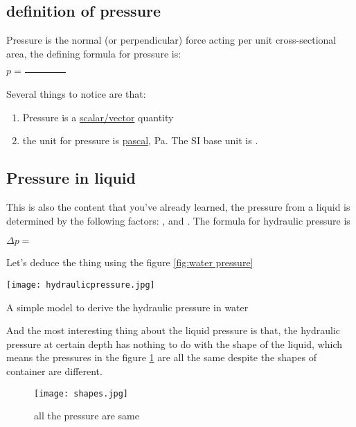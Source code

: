 \documentclass[a4paper]{tufte-handout}
\newenvironment{pagefigure}{%
    \begin{figure}[h]
    \classiccaptionstyle
  }{\end{figure}}
\newenvironment{SummBox}
{\begin{tcolorbox}[breakable,colback=r1!30,colframe=r1,title=Summary]} {\end{tcolorbox}}
\begin{document}
\subsection{definition of pressure}
Pressure is the normal (or perpendicular) force acting per unit cross-sectional area, the defining formula for pressure is:
\begin{SummBox}
\begin{center}
$ p = \frac{}{\hspace{1in}}$
\end{center}
\end{SummBox}
Several things to notice are that:
\begin{enumerate}
  \item Pressure is a \uline{scalar/vector} quantity
  \item the unit for pressure is \uline{pascal}, \si{\pascal}. The SI base unit is \uline{\hspace{2in}}.
\end{enumerate}


\subsection{Pressure in liquid}
This is also the content that you've already learned, the pressure from a liquid is determined by the following factors: \uline{\hspace{1 in}}, \uline{\hspace{1 in}} and \uline{\hspace{1 in}}. The formula for hydraulic pressure is
\begin{SummBox}
\begin{center}
$\Delta p = \hspace{2in}$
\end{center}
\end{SummBox}
Let's deduce the thing using the figure \ref{fig:water pressure}
\begin{marginfigure}
\texttt{[image: hydraulicpressure.jpg]}
\caption{A simple model to derive the hydraulic pressure in water}
\label{fig:water pressure}
\end{marginfigure}
\vspace{2in}

And the most interesting thing about the liquid pressure is that, the hydraulic pressure at certain depth has nothing to do with the shape of the liquid, which means the pressures in the figure \ref{fig:shapes} are all the same despite the shapes of container are different.
\begin{pagefigure}
\centering
\texttt{[image: shapes.jpg]} %
\caption{all the pressure are same}
\label{fig:shapes}
\end{pagefigure}
\end{document}
